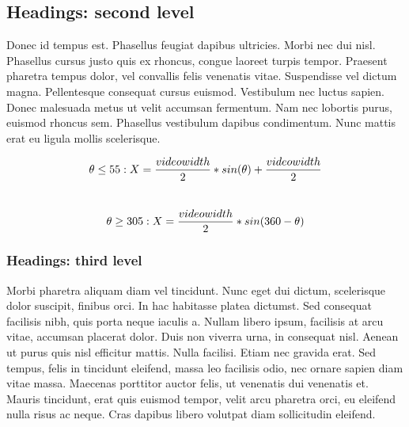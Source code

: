 \documentclass{article}
\begin{document}
\subsection{Headings: second level}
Donec id tempus est. Phasellus feugiat dapibus ultricies. Morbi nec dui nisl. Phasellus cursus justo quis ex rhoncus, congue laoreet turpis tempor. Praesent pharetra tempus dolor, vel convallis felis venenatis vitae. Suspendisse vel dictum magna. Pellentesque consequat cursus euismod. Vestibulum nec luctus sapien. Donec malesuada metus ut velit accumsan fermentum. Nam nec lobortis purus, euismod rhoncus sem. Phasellus vestibulum dapibus condimentum. Nunc mattis erat eu ligula mollis scelerisque. 

\begin{equation} \label{eq1}
  \theta \leq  55:
  X = \frac{video width}{2} * sin(\theta) + \frac{video width}{2}\\
\end{equation}
\\
\begin{equation} \label{eq2}
  \theta \geq 305:
  X = \frac{video width}{2} * sin(360 - \theta)\\
\end{equation}
  

\subsubsection{Headings: third level}
Morbi pharetra aliquam diam vel tincidunt. Nunc eget dui dictum, scelerisque dolor suscipit, finibus orci. In hac habitasse platea dictumst. Sed consequat facilisis nibh, quis porta neque iaculis a. Nullam libero ipsum, facilisis at arcu vitae, accumsan placerat dolor. Duis non viverra urna, in consequat nisl. Aenean ut purus quis nisl efficitur mattis. Nulla facilisi. Etiam nec gravida erat. Sed tempus, felis in tincidunt eleifend, massa leo facilisis odio, nec ornare sapien diam vitae massa. Maecenas porttitor auctor felis, ut venenatis dui venenatis et. Mauris tincidunt, erat quis euismod tempor, velit arcu pharetra orci, eu eleifend nulla risus ac neque. Cras dapibus libero volutpat diam sollicitudin eleifend. 
\end{document}
